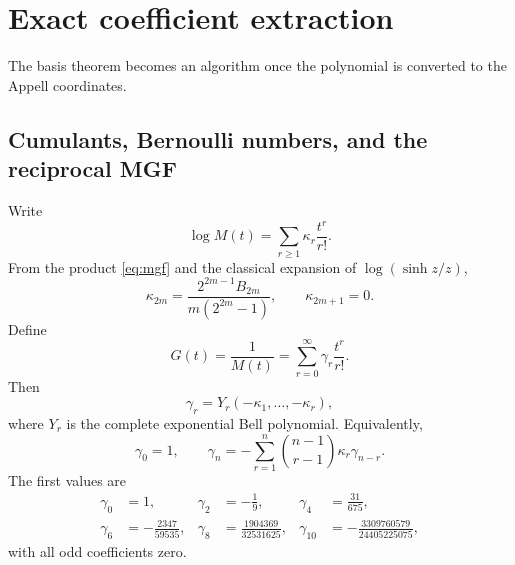 \documentclass[11pt]{article}
\theoremstyle{definition}
\theoremstyle{remark}
\newcommand{\1}{\mathbf{1}}
\begin{document}
\section{Exact coefficient extraction}

The basis theorem becomes an algorithm once the polynomial is converted to the
Appell coordinates.

\subsection{Cumulants, Bernoulli numbers, and the reciprocal MGF}

Write
\begin{equation}
 \log M(t)=\sum_{r\geq1}\kappa_r\frac{t^r}{r!}.
 \label{eq:cumulant-def}
\end{equation}
From the product \eqref{eq:mgf} and the classical expansion of
$\log(\sinh z/z)$,
\begin{equation}
 \kappa_{2m}
 =\frac{2^{2m-1}B_{2m}}{m(2^{2m}-1)},
 \qquad
 \kappa_{2m+1}=0.
 \label{eq:cumulants}
\end{equation}
Define
\begin{equation}
 G(t)=\frac1{M(t)}
 =\sum_{r=0}^{\infty}\gamma_r\frac{t^r}{r!}.
 \label{eq:G-gamma}
\end{equation}
Then
\begin{equation}
 \gamma_r=Y_r(-\kappa_1,\ldots,-\kappa_r),
 \label{eq:gamma-Bell}
\end{equation}
where $Y_r$ is the complete exponential Bell polynomial.  Equivalently,
\begin{equation}
 \gamma_0=1,
 \qquad
 \gamma_n=-\sum_{r=1}^{n}\binom{n-1}{r-1}
 \kappa_r\gamma_{n-r}.
 \label{eq:gamma-recurrence}
\end{equation}
The first values are
\begin{align}
 \gamma_0&=1,&
 \gamma_2&=-\frac19,&
 \gamma_4&=\frac{31}{675},\nonumber\\
 \gamma_6&=-\frac{2347}{59535},&
 \gamma_8&=\frac{1904369}{32531625},&
 \gamma_{10}&=-\frac{3309760579}{24405225075},
 \label{eq:gamma-values}
\end{align}
with all odd coefficients zero.
\end{document}
